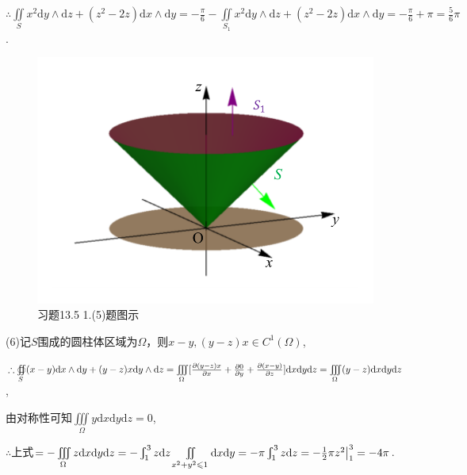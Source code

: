 \documentclass[12pt,UTF8,fleqn]{ctexart}
\newcommand{\Int}[4]{\varint\nolimits_{#1}^{#2}#3\mathrm d#4}
\newcommand{\varIInt}[4]{\iint\limits_{#1}#2\mathrm d#3\mathrm d#4}
\newcommand{\varIIInt}[5]{\iiint\limits_{#1}#2\mathrm d#3\mathrm d#4\mathrm d#5}
\newcommand{\md}[1]{\mathrm d#1}
\newcommand{\BSIInt}[2]{\iint\limits_{#1}#2}
\newcommand{\pp}[2]{\frac{\partial #1}{\partial #2}}
\newcommand{\BSOIInt}[2]{\oiint\limits_{#1}#2}
\begin{document}
\begin{enumerate}
$\therefore\BSIInt S{x^2\md y\wedge\md z+(z^2-2z)\md x\wedge\md y}=-\frac\pi6-\BSIInt{S_1}{x^2\md y\wedge\md z+(z^2-2z)\md x\wedge\md y}=-\frac\pi6+\pi=\frac56\pi$.

\begin{figure}[H]
\begin{center}
\includegraphics[height=0.5\textheight]{Figures24/Fig13-5-1-5.pdf}
\end{center}
\caption{习题13.5 1.(5)题图示}
\label{13-5-1-5}
\end{figure}

(6)记$S$围成的圆柱体区域为$\Omega$，则$x-y,(y-z)x\in C^1(\Omega)$,

$\therefore\BSOIInt S{(x-y)\md x\wedge\md y+(y-z)x\md y\wedge\md z}=\varIIInt\Omega{[\pp{(y-z)x}x+\pp0y+\pp{(x-y)}z]}xyz\\
=\varIIInt\Omega{(y-z)}xyz$,

由对称性可知$\varIIInt\Omega{y}xyz=0$,

$\therefore$上式$=-\varIIInt\Omega{z}xyz=-\Int13zz\varIInt{x^2+y^2\leqslant1}{}xy=-\pi\Int13zz=-\frac12\pi z^2\big|_1^3=-4\pi$.


\end{enumerate}
\end{document}
